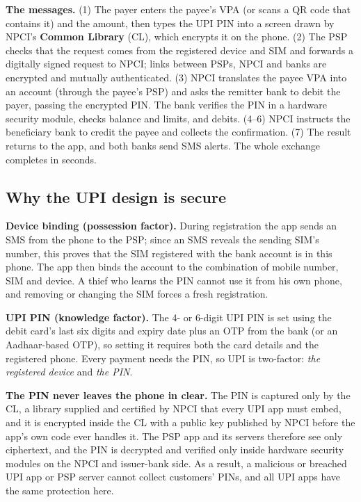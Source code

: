 \textbf{The messages.} (1) The payer enters the payee's VPA (or scans a QR code that contains it) and the amount, then types the UPI PIN into a screen drawn by NPCI's \textbf{Common Library} (CL), which encrypts it on the phone. (2) The PSP checks that the request comes from the registered device and SIM and forwards a digitally signed request to NPCI; links between PSPs, NPCI and banks are encrypted and mutually authenticated. (3) NPCI translates the payee VPA into an account (through the payee's PSP) and asks the remitter bank to debit the payer, passing the encrypted PIN. The bank verifies the PIN in a hardware security module, checks balance and limits, and debits. (4--6) NPCI instructs the beneficiary bank to credit the payee and collects the confirmation. (7) The result returns to the app, and both banks send SMS alerts. The whole exchange completes in seconds.

\subsection{Why the UPI design is secure \new}

\textbf{Device binding (possession factor).} During registration the app sends an SMS from the phone to the PSP; since an SMS reveals the sending SIM's number, this proves that the SIM registered with the bank account is in this phone. The app then binds the account to the combination of mobile number, SIM and device. A thief who learns the PIN cannot use it from his own phone, and removing or changing the SIM forces a fresh registration.

\textbf{UPI PIN (knowledge factor).} The 4- or 6-digit UPI PIN is set using the debit card's last six digits and expiry date plus an OTP from the bank (or an Aadhaar-based OTP), so setting it requires both the card details and the registered phone. Every payment needs the PIN, so UPI is two-factor: \emph{the registered device} and \emph{the PIN}.

\textbf{The PIN never leaves the phone in clear.} The PIN is captured only by the CL, a library supplied and certified by NPCI that every UPI app must embed, and it is encrypted inside the CL with a public key published by NPCI before the app's own code ever handles it. The PSP app and its servers therefore see only ciphertext, and the PIN is decrypted and verified only inside hardware security modules on the NPCI and issuer-bank side. As a result, a malicious or breached UPI app or PSP server cannot collect customers' PINs, and all UPI apps have the same protection here.

